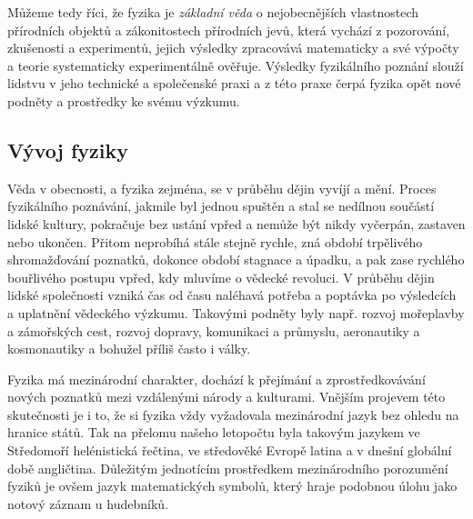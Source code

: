       \begin{tcnote}
        Můžeme tedy říci, že fyzika je \emph{základní věda} o nejobecnějších vlastnostech přírodních
        objektů a zákonitostech přírodních jevů, která vychází z pozorování, zkušenosti a
        experimentů, jejich výsledky zpracovává matematicky a své výpočty a teorie systematicky
        experimentálně ověřuje. Výsledky fyzikálního poznání slouží lidstvu v jeho technické a
        společenské praxi a z této praxe čerpá fyzika opět nové podněty a prostředky ke svému
        výzkumu. \cite[s.~16]{Stoll2009} 
      \end{tcnote}
    
    \subsection{Vývoj fyziky}\label{fyz:IchapIIsecIssecII}     
      Věda v obecnosti, a fyzika zejména, se v průběhu dějin vyvíjí a mění. Proces fyzikálního
      poznávání, jakmile byl jednou spuštěn a stal se nedílnou součástí lidské kultury, pokračuje
      bez ustání vpřed a nemůže být nikdy vyčerpán, zastaven nebo ukončen. Přitom neprobíhá stále
      stejně rychle, zná období trpělivého shromažďování poznatků, dokonce období stagnace a úpadku,
      a pak zase rychlého bouřlivého postupu vpřed, kdy mluvíme o vědecké revoluci. V průběhu dějin
      lidské společnosti vzniká čas od času naléhavá potřeba a poptávka po výsledcích a uplatnění
      vědeckého výzkumu. Takovými podněty byly např. rozvoj mořeplavby a zámořských cest, rozvoj
      dopravy, komunikaci a průmyslu, aeronautiky a kosmonautiky a bohužel příliš často i války.

      Fyzika má mezinárodní charakter, dochází k přejímání a zprostředkovávání nových poznatků mezi
      vzdálenými národy a kulturami. Vnějším projevem této skutečnosti je i to, že si fyzika vždy
      vyžadovala mezinárodní jazyk bez ohledu na hranice států. Tak na přelomu našeho letopočtu byla
      takovým jazykem ve Středomoří helénistická řečtina, ve středověké Evropě latina a v dnešní
      globální době angličtina. Důležitým jednotícím prostředkem mezinárodního porozumění fyziků je
      ovšem jazyk matematických symbolů, který hraje podobnou úlohu jako notový záznam u hudebníků.

